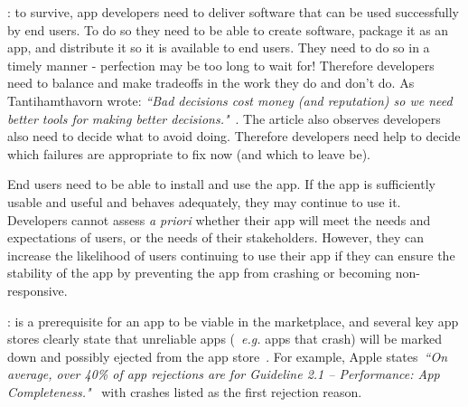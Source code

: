: to survive, app developers need to deliver software that can be used successfully by end users. To do so they need to be able to create software, package it as an app, and distribute it so it is available to end users.
%
They need to do so in a timely manner - perfection may be too long to wait for! Therefore developers need to balance and make tradeoffs in the work they do and don't do. As Tantihamthavorn wrote: \emph{``Bad decisions cost money (and reputation) so we need better tools for making better decisions."}~. The article also observes developers also need to decide what to avoid doing. Therefore developers need help to decide which failures are appropriate to fix now (and which to leave be).

End users need to be able to install and use the app. If the app is sufficiently usable and useful and behaves adequately, they may continue to use it. Developers cannot assess \emph{a priori} whether their app will meet the needs and expectations of users, or the needs of their stakeholders. However, they can increase the likelihood of users continuing to use their app if they can ensure the stability of the app by preventing the app from crashing or becoming non-responsive. 

: is a prerequisite for an app to be viable in the marketplace, and several key app stores clearly state that unreliable apps (~\emph{e.g.} apps that crash) will be marked down and possibly ejected from the app store~. For example, Apple states~\emph{``On average, over 40\% of app rejections are for Guideline 2.1 – Performance: App Completeness."}~ with crashes listed as the first rejection reason. %

